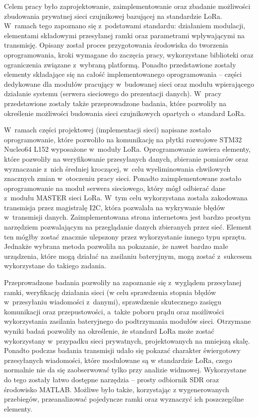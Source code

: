 Celem pracy było zaprojektowanie, zaimplementowanie oraz zbadanie możliwości zbudowania prywatnej sieci czujnikowej
bazującej na standardzie LoRa. W~ramach tego zapoznano się z~podstawami standardu: działaniem modulacji, elementami
składowymi przesyłanej ramki oraz parametrami wpływającymi na transmisję. Opisany został proces przygotowania środowiska
do tworzenia oprogramowania, kroki wymagane do zaczęcia pracy, wykorzystane biblioteki oraz ograniczenia związane
z~wybraną platformą. Ponadto przedstawione zostały elementy składające się na całość implementowanego oprogramowania --
części dedykowane dla modułów pracujący w~budowanej sieci oraz modułu wpierającego działanie systemu (serwera sieciowego
do prezentacji danych). W~pracy przedstawione zostały także przeprowadzone badania, które pozwoliły na określenie
możliwości budowania sieci czujnikowych opartych o~standard LoRa.

W~ramach części projektowej (implementacji sieci) napisane zostało oprogramowanie, które pozwoliło na komunikację na
płytki rozwojowe STM32 Nucleo64 L152 wyposażone w~moduły LoRa. Oprogramowanie zawiera elementy, które pozwoliły na
weryfikowanie przesyłanych danych, zbieranie pomiarów oraz wyznaczanie z~nich średniej kroczącej, w~celu wyeliminowania
chwilowych znacznych zmian w~otoczeniu pracy sieci. Ponadto zaimplementowane zostało oprogramowanie na moduł serwera
sieciowego, który mógł odbierać dane z~modułu MASTER sieci LoRa. W~tym celu wykorzystana została zakodowana transmisja
przez magistralę I2C, która pozwalała na wykrywanie błędów w~transmisji danych. Zaimplementowana strona internetowa jest
bardzo prostym narzędziem pozwalającym na przeglądanie danych zbieranych przez sieć. Element ten mógłby zostać znacznie
ulepszony przez wykorzystanie innego typu sprzętu. Jednakże wybrana metoda pozwoliła na pokazanie, że nawet bardzo małe
urządzenia, które mogą działać na zasilaniu bateryjnym, mogą zostać z~sukcesem wykorzystane do takiego zadania.

Przeprowadzone badania pozwoliły na zapoznanie się z~wyglądem przesyłanej ramki, weryfikację działania sieci (w celu
sprawdzenia stopnia błędów w~przesyłaniu wiadomości z~danymi), sprawdzenie skutecznego zasięgu komunikacji oraz
przepustowości, a~także poboru prądu oraz możliwości wykorzystania zasilania bateryjnego do podtrzymania modułów sieci.
Otrzymane wyniki badań pozwoliły na określenie, że standard LoRa może zostać wykorzystany w~przypadku sieci prywatnych,
projektowanych na mniejszą skalę. Ponadto podczas badania transmisji udało się pokazać charakter świergotowy
przesyłanych wiadomości, które modulowane są w standardzie LoRa, czego normalnie nie da się zaobserwować tylko przy
analizie widmowej. Wykorzystane do tego zostały łatwo dostępne narzędzia -- prosty odbiornik SDR oraz środowisko MATLAB.
Możliwe było także, korzystając z wygenerowanych przebiegów, przeanalizować pojedyncze ramki oraz wyznaczyć ich
poszczególne elementy.

